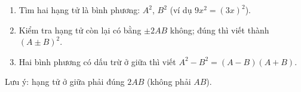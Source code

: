 \begin{enumerate}
\item Tìm hai hạng tử là bình phương: $A^2$, $B^2$ (ví dụ $9x^2=(3x)^2$).
\item Kiểm tra hạng tử còn lại có bằng $\pm 2AB$ không; đúng thì viết thành $(A\pm B)^2$.
\item Hai bình phương có dấu trừ ở giữa thì viết $A^2-B^2=(A-B)(A+B)$.
\end{enumerate}
Lưu ý: hạng tử ở giữa phải đúng $2AB$ (không phải $AB$).
